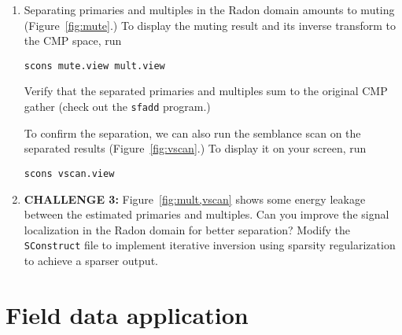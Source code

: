 \begin{enumerate}
\item Separating primaries and multiples in the Radon domain amounts to muting (Figure~\ref{fig:mute}.) To display the muting result and its inverse transform to the CMP space, run
\begin{verbatim}
scons mute.view mult.view
\end{verbatim}
Verify that the separated primaries and multiples sum to the original CMP gather (check out the \texttt{sfadd} program.)

To confirm the separation, we can also run the semblance scan on the separated results (Figure~\ref{fig:vscan}.) To display it on your screen, run
\begin{verbatim}
scons vscan.view
\end{verbatim}



\item \textbf{CHALLENGE 3:} Figure~\ref{fig:mult,vscan} shows some energy leakage between the estimated primaries and multiples. Can you improve the signal localization in the Radon domain for better separation? Modify the \texttt{SConstruct} file to implement iterative inversion using sparsity regularization to achieve a sparser output.

\end{enumerate}

\lstset{language=c,numbers=left,numberstyle=\tiny,showstringspaces=false}


\lstset{language=python,numbers=left,numberstyle=\tiny,showstringspaces=false}


\section{Field data application}


\lstset{language=python,numbers=left,numberstyle=\tiny,showstringspaces=false}


